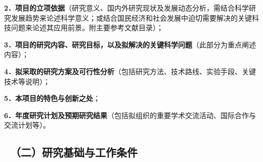 \documentclass[12pt,UTF8,AutoFakeBold=2,a4paper]{ctexart} %
\newcommand{\sihao}{\fontsize{14pt}{\baselineskip}\selectfont}
\begin{document}
	


{\sihao \kaishu \color{MsBlue}
\textbf{2．项目的立项依据}（研究意义、国内外研究现状及发展动态分析，需结合科学研究发展趋势来论述科学意义；或结合国民经济和社会发展中迫切需要解决的关键科技问题来论述其应用前景。附主要参考文献目录）；
}




\vspace{0.3cm}
{\sihao \kaishu \color{MsBlue}
\textbf{3．项目的研究内容、研究目标，以及拟解决的关键科学问题}（此部分为重点阐述内容）；
}





\vspace{0.3cm}

{\sihao \kaishu \color{MsBlue}
	\textbf{4．拟采取的研究方案及可行性分析}（包括研究方法、技术路线、实验手段、关键技术等说明）；
}




\vspace{0.3cm}

{\sihao \kaishu \color{MsBlue}
\textbf{5．本项目的特色与创新之处}；
}



\vspace{0.3cm}

{\sihao \kaishu \color{MsBlue}
\textbf{6．年度研究计划及预期研究结果}（包括拟组织的重要学术交流活动、国际合作与交流计划等）。
}




\vspace{0.3cm}

{\color{MsBlue} \subsection{\sihao \kaishu \quad \ （二）研究基础与工作条件}}




\vspace{3mm}
\end{document}
